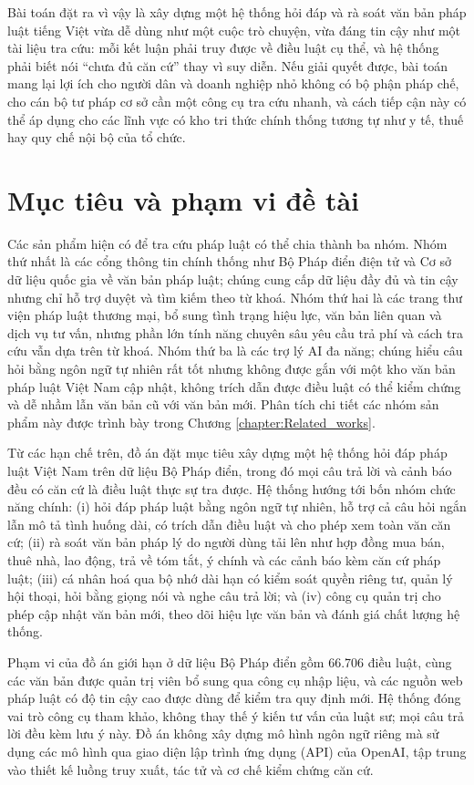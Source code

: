 \documentclass[../DoAn.tex]{subfiles}
\begin{document}
Bài toán đặt ra vì vậy là xây dựng một hệ thống hỏi đáp và rà soát văn bản pháp luật tiếng Việt vừa dễ dùng như một cuộc trò chuyện, vừa đáng tin cậy như một tài liệu tra cứu: mỗi kết luận phải truy được về điều luật cụ thể, và hệ thống phải biết nói ``chưa đủ căn cứ'' thay vì suy diễn. Nếu giải quyết được, bài toán mang lại lợi ích cho người dân và doanh nghiệp nhỏ không có bộ phận pháp chế, cho cán bộ tư pháp cơ sở cần một công cụ tra cứu nhanh, và cách tiếp cận này có thể áp dụng cho các lĩnh vực có kho tri thức chính thống tương tự như y tế, thuế hay quy chế nội bộ của tổ chức.

\section{Mục tiêu và phạm vi đề tài}
\label{section:1.2}
Các sản phẩm hiện có để tra cứu pháp luật có thể chia thành ba nhóm. Nhóm thứ nhất là các cổng thông tin chính thống như Bộ Pháp điển điện tử và Cơ sở dữ liệu quốc gia về văn bản pháp luật; chúng cung cấp dữ liệu đầy đủ và tin cậy nhưng chỉ hỗ trợ duyệt và tìm kiếm theo từ khoá. Nhóm thứ hai là các trang thư viện pháp luật thương mại, bổ sung tình trạng hiệu lực, văn bản liên quan và dịch vụ tư vấn, nhưng phần lớn tính năng chuyên sâu yêu cầu trả phí và cách tra cứu vẫn dựa trên từ khoá. Nhóm thứ ba là các trợ lý AI đa năng; chúng hiểu câu hỏi bằng ngôn ngữ tự nhiên rất tốt nhưng không được gắn với một kho văn bản pháp luật Việt Nam cập nhật, không trích dẫn được điều luật có thể kiểm chứng và dễ nhầm lẫn văn bản cũ với văn bản mới. Phân tích chi tiết các nhóm sản phẩm này được trình bày trong Chương \ref{chapter:Related_works}.

Từ các hạn chế trên, đồ án đặt mục tiêu xây dựng một hệ thống hỏi đáp pháp luật Việt Nam trên dữ liệu Bộ Pháp điển, trong đó mọi câu trả lời và cảnh báo đều có căn cứ là điều luật thực sự tra được. Hệ thống hướng tới bốn nhóm chức năng chính: (i) hỏi đáp pháp luật bằng ngôn ngữ tự nhiên, hỗ trợ cả câu hỏi ngắn lẫn mô tả tình huống dài, có trích dẫn điều luật và cho phép xem toàn văn căn cứ; (ii) rà soát văn bản pháp lý do người dùng tải lên như hợp đồng mua bán, thuê nhà, lao động, trả về tóm tắt, ý chính và các cảnh báo kèm căn cứ pháp luật; (iii) cá nhân hoá qua bộ nhớ dài hạn có kiểm soát quyền riêng tư, quản lý hội thoại, hỏi bằng giọng nói và nghe câu trả lời; và (iv) công cụ quản trị cho phép cập nhật văn bản mới, theo dõi hiệu lực văn bản và đánh giá chất lượng hệ thống.

Phạm vi của đồ án giới hạn ở dữ liệu Bộ Pháp điển gồm 66.706 điều luật, cùng các văn bản được quản trị viên bổ sung qua công cụ nhập liệu, và các nguồn web pháp luật có độ tin cậy cao được dùng để kiểm tra quy định mới. Hệ thống đóng vai trò công cụ tham khảo, không thay thế ý kiến tư vấn của luật sư; mọi câu trả lời đều kèm lưu ý này. Đồ án không xây dựng mô hình ngôn ngữ riêng mà sử dụng các mô hình qua giao diện lập trình ứng dụng (API) của OpenAI, tập trung vào thiết kế luồng truy xuất, tác tử và cơ chế kiểm chứng căn cứ.
\end{document}
